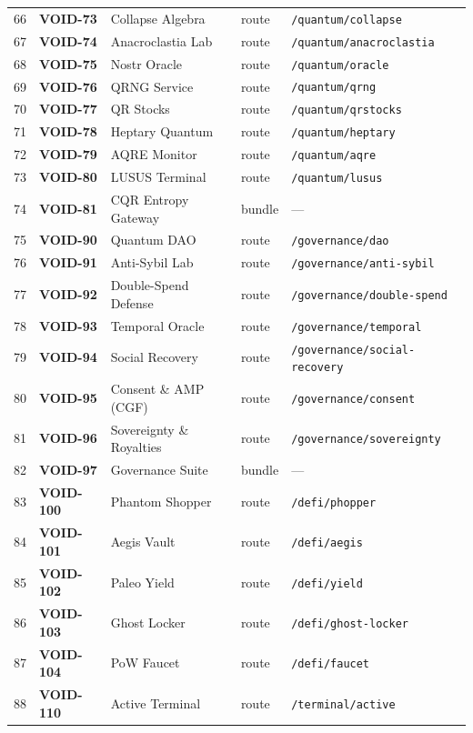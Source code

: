\documentclass[10pt,a4paper,landscape]{article}
\begin{document}
\begin{longtable}{@{}rl p{4.2cm} p{1.4cm} p{3.8cm}@{}}
66 & \textbf{VOID-73} & Collapse Algebra & route & \texttt{/quantum/collapse} \\
67 & \textbf{VOID-74} & Anacroclastia Lab & route & \texttt{/quantum/anacroclastia} \\
68 & \textbf{VOID-75} & Nostr Oracle & route & \texttt{/quantum/oracle} \\
69 & \textbf{VOID-76} & QRNG Service & route & \texttt{/quantum/qrng} \\
70 & \textbf{VOID-77} & QR Stocks & route & \texttt{/quantum/qrstocks} \\
71 & \textbf{VOID-78} & Heptary Quantum & route & \texttt{/quantum/heptary} \\
72 & \textbf{VOID-79} & AQRE Monitor & route & \texttt{/quantum/aqre} \\
73 & \textbf{VOID-80} & LUSUS Terminal & route & \texttt{/quantum/lusus} \\
74 & \textbf{VOID-81} & CQR Entropy Gateway & bundle & — \\
75 & \textbf{VOID-90} & Quantum DAO & route & \texttt{/governance/dao} \\
76 & \textbf{VOID-91} & Anti-Sybil Lab & route & \texttt{/governance/anti-sybil} \\
77 & \textbf{VOID-92} & Double-Spend Defense & route & \texttt{/governance/double-spend} \\
78 & \textbf{VOID-93} & Temporal Oracle & route & \texttt{/governance/temporal} \\
79 & \textbf{VOID-94} & Social Recovery & route & \texttt{/governance/social-recovery} \\
80 & \textbf{VOID-95} & Consent \& AMP (CGF) & route & \texttt{/governance/consent} \\
81 & \textbf{VOID-96} & Sovereignty \& Royalties & route & \texttt{/governance/sovereignty} \\
82 & \textbf{VOID-97} & Governance Suite & bundle & — \\
83 & \textbf{VOID-100} & Phantom Shopper & route & \texttt{/defi/phopper} \\
84 & \textbf{VOID-101} & Aegis Vault & route & \texttt{/defi/aegis} \\
85 & \textbf{VOID-102} & Paleo Yield & route & \texttt{/defi/yield} \\
86 & \textbf{VOID-103} & Ghost Locker & route & \texttt{/defi/ghost-locker} \\
87 & \textbf{VOID-104} & PoW Faucet & route & \texttt{/defi/faucet} \\
88 & \textbf{VOID-110} & Active Terminal & route & \texttt{/terminal/active} \\

\end{longtable}
\end{document}
